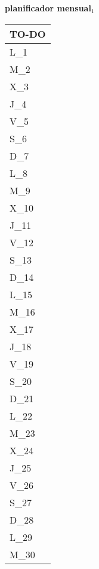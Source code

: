\clearpage
\raggedright{
	\fontsize{25}{50}\selectfont
	\textbf{\NextYear}
}\scriptsize{\textbf{planificador mensual$_1$}}\\[11.3pt]



	\noindent\dotfill
	\renewcommand{\arraystretch}{1.5}\scriptsize
		\begin{longtabu} to \textwidth { X[l]}
		\centering \small{\textbf{TO-DO}} \\
		\toprule
		L_{1} \dotfill\\
		M_{2} \dotfill\\
		X_{3} \dotfill\\
		J_{4} \dotfill\\
		V_{5} \dotfill\\
		S_{6} \dotfill\\
		D_{7} \dotfill\\
		\hline
		L_{8} \dotfill\\
		M_{9} \dotfill\\
		X_{10} \dotfill\\
		J_{11} \dotfill\\
		V_{12} \dotfill\\
		S_{13} \dotfill\\
		D_{14} \dotfill\\
		\hline
		L_{15} \dotfill\\
		M_{16} \dotfill\\
		X_{17} \dotfill\\
		J_{18} \dotfill\\
		V_{19} \dotfill\\
		S_{20} \dotfill\\
		D_{21} \dotfill\\
		\hline
		L_{22} \dotfill\\
		M_{23} \dotfill\\
		X_{24} \dotfill\\
		J_{25} \dotfill\\
		V_{26} \dotfill\\
		S_{27} \dotfill\\
		D_{28} \dotfill\\
		\hline
		L_{29} \dotfill\\
		M_{30} \dotfill\\

		\bottomrule

	\end{longtabu}


\clearpage
